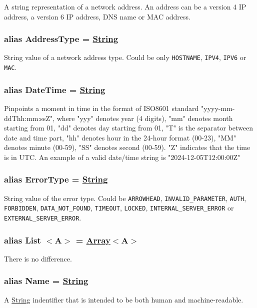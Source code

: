 \documentclass[a4paper]{arrowhead}
\newcommand{\pdef}[1]{{\textcolor{ArrowheadGrey}{#1 \label{sec:model:primitives:#1} \label{sec:model:primitives:#1s}}}}
\newcommand{\pref}[1]{{\textcolor{ArrowheadGrey}{\hyperref[sec:model:primitives:#1]{#1}}}}
\begin{document}
A string representation of a network address. An address can be a version 4 IP address, a version 6 IP address, DNS name or MAC address.

\subsubsection{alias \pdef{AddressType} = \pref{String}}
String value of a network address type. Could be only \texttt{HOSTNAME}, \texttt{IPV4}, \texttt{IPV6} or \texttt{MAC}.

\subsubsection{alias \pdef{DateTime} = \pref{String}}

Pinpoints a moment in time in the format of ISO8601 standard "yyyy-mm-ddThh:mm:ssZ", where "yyy" denotes year (4 digits), "mm" denotes month starting from 01, "dd" denotes day starting from 01, "T" is the separator between date and time part, "hh" denotes hour in the 24-hour format (00-23), "MM" denotes minute (00-59), "SS" denotes second (00-59). "Z" indicates that the time is in UTC.
An example of a valid date/time string is "2024-12-05T12:00:00Z"

\subsubsection{alias \pdef{ErrorType} = \pref{String}}

String value of the error type. Could be \texttt{ARROWHEAD}, \texttt{INVALID\_PARAMETER}, \texttt{AUTH}, \texttt{FORBIDDEN}, \texttt{DATA\_NOT\_FOUND}, \texttt{TIMEOUT}, \texttt{LOCKED}, \texttt{INTERNAL\_SERVER\_ERROR} or \texttt{EXTERNAL\_SERVER\_ERROR}.

\subsubsection{alias \pdef{List}$<$A$>$ = \pref{Array}$<$A$>$}
There is no difference.

\subsubsection{alias \pdef{Name} = \pref{String}}

A \pref{String} indentifier that is intended to be both human and machine-readable.

\newpage



\end{document}
